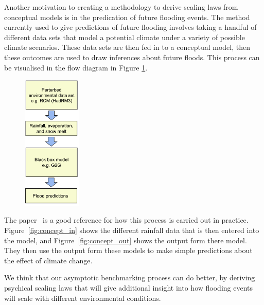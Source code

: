 \documentclass[11pt]{article}
\begin{document}
\begin{minipage}{0.35\textwidth}
    Another motivation to creating a methodology to derive scaling laws from conceptual models is in the predication of future flooding events. 
    The method currently used to give predictions of future flooding involves taking a handful of different data sets that model a potential climate under a variety of possible climate scenarios. These data sets are then fed in to a conceptual model, then these outcomes are used to draw inferences about future floods.
    This process can be visualised in the flow diagram in Figure \ref{fig:flow}.
\end{minipage}
\hspace{0.05\textwidth}
\begin{minipage}{0.55\textwidth}
    \begin{figure}[H]
    \centering
    \includegraphics[width=0.25\textwidth]{Figs/flow.png}
    \label{fig:flow}
\end{figure}
\end{minipage}

\vspace{5pt}

The paper~\cite{BELL201289} is a good reference for how this process is carried out in practice. Figure~\ref{fig:concept_in} shows the different rainfall data that is then entered into the model, and Figure~\ref{fig:concept_out} shows the output form there model. They then use the output form these models to make simple predictions about the effect of climate change.

We think that our asymptotic benchmarking process can do better, by deriving psychical scaling laws that will give additional insight into how flooding events will scale with different environmental conditions.
\end{document}
